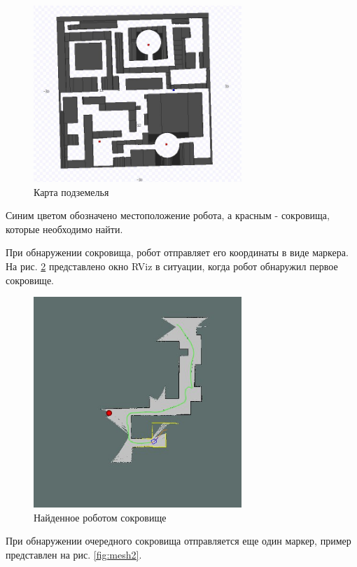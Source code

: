 \documentclass[14pt, a4paper]{extarticle}
\begin{document}
	\begin{figure}[h]
		\centering
		\includegraphics[width=0.7\textwidth]{map}
		\caption{Карта подземелья}
		\label{fig:map}
	\end{figure}

	Синим цветом обозначено местоположение робота, а красным - сокровища, которые необходимо найти.
	
	При обнаружении сокровища, робот отправляет его координаты в виде маркера. На рис. \ref{fig:mesh1} представлено окно RViz в ситуации, когда робот обнаружил первое сокровище.
	
	\begin{figure}[h]
		\centering
		\includegraphics[width=0.7\textwidth]{exp1}
		\caption{Найденное роботом сокровище}
		\label{fig:mesh1}
	\end{figure}

	При обнаружении очередного сокровища отправляется еще один маркер, пример представлен на рис. \ref{fig:mesh2}.
\end{document}

